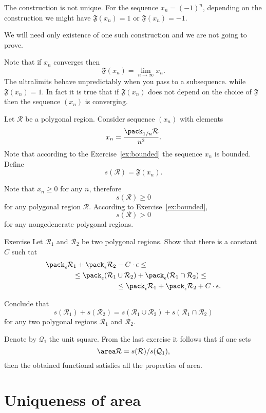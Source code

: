 {The construction is not unique. 
For the sequence $x_n=(-1)^n$,
depending on the construction we might have $\mathfrak{F}(x_n)=1$ or $\mathfrak{F}(x_n)=-1$.

We will need only existence of one such construction
and we are not going to prove. %

Note that if $x_n$ converges then
$$\mathfrak{F}(x_n)=\lim_{n\to\infty} x_n.$$
The ultralimits behave unpredictably when you pass to a subsequence.
 while
$\mathfrak{F}(x_n)=1$.
In fact it is true that if $\mathfrak{F}(x_n)$ does not depend on the choice of  $\mathfrak{F}$ then the sequence $(x_n)$ is converging.

Let $\mathcal R$ be a polygonal region.
Consider sequence $(x_n)$ with elements
$$x_n=\frac{\pack_{1/n} \mathcal R}{n^2}.$$
Note that according to the Exercise~\ref{ex:bounded} the sequence $x_n$ is bounded.
Define 
$$s(\mathcal R)=\mathfrak{F}(x_n).$$

Note that $x_n\ge 0$ for any $n$, therefore 
$$s(\mathcal R)\ge 0$$
for any polygonal region $\mathcal R$.
According to Exercise~\ref{ex:bounded},
$$s(\mathcal R)> 0$$
for any nongedenerate polygonal regions.


\begin{thm}{Exercise}
Let $\mathcal R_1$ and $\mathcal R_2$ be  two polygonal regions.
Show that there is a constant $C$ such tat
\begin{align*}
\pack_\epsilon \mathcal R_1 +\pack_\epsilon\mathcal R_2 &-C\cdot\epsilon\le
\\
\le
\pack_\epsilon (\mathcal R_1&\cup\mathcal R_2) +\pack_\epsilon (\mathcal R_1\cap\mathcal R_2)
\le 
\\
&\le
\pack_\epsilon \mathcal R_1 +\pack_\epsilon\mathcal R_2 +C\cdot\epsilon.
\end{align*}

Conclude that 
$$s(\mathcal{R}_1)+s (\mathcal{R}_2)=s(\mathcal{R}_1\cup\mathcal{R}_2)+s(\mathcal{R}_1\cap\mathcal{R}_2)$$
for any two polygonal regions $\mathcal R_1$ and $\mathcal R_2$.
\end{thm}

Denote by $\mathcal{Q}_1$ the unit square.
From the last exercise it follows that if one sets
$$\area\mathcal{R}=s(\mathcal{R})/s(\mathcal{Q}_1),$$
then the obtained functional satisfies all the properties of area.

\section*{Uniqueness of area}

}
